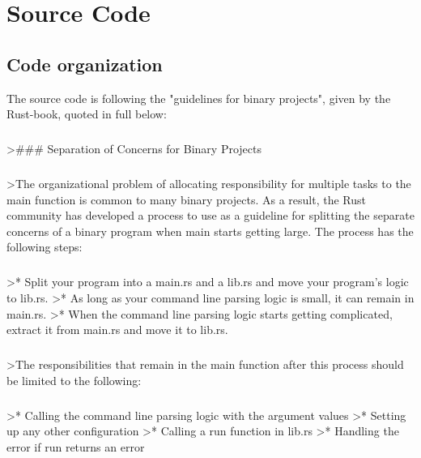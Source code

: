 \chapter{Source Code}

\section{Code organization}

The source code is following the "guidelines for binary projects", given by the Rust-book, quoted in full below:


\paragraph{}
>### Separation of Concerns for Binary Projects

\paragraph{}
>The organizational problem of allocating responsibility for multiple tasks to the main function is common to many binary projects. As a result, the Rust community has developed a process to use as a guideline for splitting the separate concerns of a binary program when main starts getting large. The process has the following steps:


\paragraph{}
>* Split your program into a main.rs and a lib.rs and move your program’s logic to lib.rs.
>* As long as your command line parsing logic is small, it can remain in main.rs.
>* When the command line parsing logic starts getting complicated, extract it from main.rs and move it to lib.rs.


\paragraph{}
>The responsibilities that remain in the main function after this process should be limited to the following:


\paragraph{}
>* Calling the command line parsing logic with the argument values
>* Setting up any other configuration
>* Calling a run function in lib.rs
>* Handling the error if run returns an error


